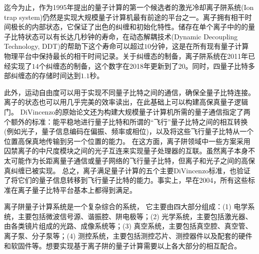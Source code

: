迄今为止，作为1995年提出的量子计算的第一个候选者的激光冷却离子阱系统(Ion trap system)仍然是实现大规模量子计算机最有前途的平台之一。离子拥有相干时间极长\cite[]{Fisk_Sellars_Lawn_Coles_1997}的内部状态，它保证了出色的纠缠和初始化特性\cite[]{Blatt_Wineland_2008}。储存在单个离子中的的量子比特状态可以有长达几秒钟的寿命\cite[]{Langer_Ozeri_Jost_Chiaverini_DeMarco_Ben_Kish_Blakestad_Britton_Hume_Itano_et_al_2005}，在动态解耦技术(Dynamic Decoupling Technology, DDT)的帮助下这个寿命可以超过$10$分钟\cite[]{Wang_Um_Zhang_An_Lyu_Zhang_Duan_Yum_Kim_2017}，这是在所有现有量子计算物理平台中保持最长的相干时间记录。关于纠缠态的制备，离子阱系统在2011年已经实现了$14$个纠缠态的制备\cite[]{Monz_Schindler_Barreiro_Chwalla_Nigg_Coish_Harlander_Hänsel_Hennrich_Blatt_2011}，这个数字在2018年更新到了20\cite[]{Friis_Marty_Maier_Hempel_Holzäpfel_Jurcevic_Plenio_Huber_Roos_Blatt_et_al_2018}。同时，四量子比特多部纠缠态的存储时间达到$1.1$秒\cite[]{Kaufmann_Ruster_Schmiegelow_Luda_Kaushal_Schulz_von_Lindenfels_Schmidt_Kaler_Poschinger_2017}。

此外，运动自由度可以用于实现不同量子比特之间的通信，确保全量子比特连接\cite[]{Debnath_Linke_Figgatt_Landsman_Wright_Monroe_2016}。离子的状态也可以用几乎完美的效率读出\cite[]{Myerson_Szwer_Webster_Allcock_Curtis_Imreh_Sherman_Stacey_Steane_Lucas_2008}，在此基础上可以构建高保真量子逻辑门\cite[]{Ballance_Harty_Linke_Sepiol_Lucas_2016}。
DiVincenzo的原始论文还为构建大规模量子计算机所需的量子通信指定了两个额外的标准：能平稳地进行量子比特和所谓的“飞行”量子比特之间的相互转换(例如光子，量子信息编码在偏振、频率或相位)，以及将这些飞行量子比特从一个位置高保真地传输到另一个位置的能力。
在这方面，离子阱领域中一些方案采用囚禁离子的中尺度模块之间的光子互连来实现量子处理器的互联\cite[]{Monroe_Raussendorf_Ruthven_Brown_Maunz_Duan_Kim_2014}。虽然离子本身不太可能作为长距离量子通信或量子网络的飞行量子比特，但离子和光子之间的高保真纠缠已被实现\cite[]{Moehring_Blinov_Madsen_Duan_Monroe_2004}。
总之，离子满足量子计算的五个主要DiVincenzo标准，也验证了将它们的量子信息转移到飞行量子比特的能力。事实上，早在2004，所有这些标准在离子量子比特平台基本上都得到满足\cite[]{Leibfried_DeMarco_Meyer_Lucas_Barrett_Britton_Itano_Jelenković_Langer_Rosenband_et_al_2003,Moehring_Blinov_Madsen_Duan_Monroe_2004}。

离子阱量子计算系统是一个复杂综合的系统，
它主要由四大部分组成：(1) 电学系统，主要包括微波信号源、谐振腔、阱电极等；(2) 光学系统，主要包括激光器、由各类镜片组成的光路、成像系统等；(3) 真空系统，主要包括真空腔、真空管、离子泵、分子泵等；(4) 测控系统，主要包括测控芯片、测控器件以及配套的硬件和软固件等。想要实现基于离子阱的量子计算需要以上各大部分的相互配合。


